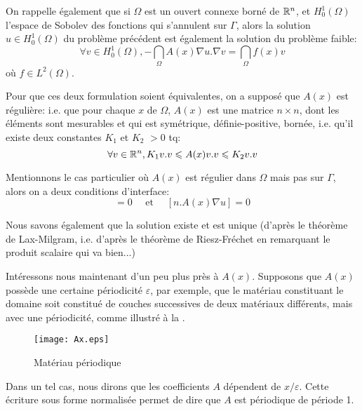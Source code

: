 On rappelle également que si $\Omega$ est un ouvert connexe borné de $\mathbb R^n$, et
$H_0^1(\Omega)$ l'espace de Sobolev des fonctions qui s'annulent sur $\Gamma$, alors la solution
$u\in H_0^1(\Omega)$ du problème précédent est également la solution du problème
faible:
\begin{equation}
\forall v\in H_0^1(\Omega), -\dint_\Omega A(x)\nabla u.\nabla v = \dint_\Omega f(x)v
\end{equation}
où $f\in L^2(\Omega)$.

Pour que ces deux formulation soient équivalentes, on a supposé que $A(x)$ est
régulière: i.e. que pour chaque $x$ de $\Omega$, $A(x)$ est une matrice $n\times n$,
dont les éléments sont mesurables et qui est symétrique, définie-positive, bornée, i.e. qu'il existe 
deux constantes $K_1$ et $K_2$ $>0$ tq:
\begin{equation}\forall v\in\mathbb R^n, K_1 v.v \leqslant A(x) v.v \leqslant K_2 v.v\end{equation}

Mentionnons le cas particulier où $A(x)$ est régulier dans $\Omega$ mais
pas sur $\Gamma$, alors on a deux conditions d'interface:
\begin{equation}
[u]=0 \quad\text{ et }\quad [n.A(x)\nabla u]=0
\end{equation}

Nous savons également que la solution existe et est unique (d'après le théorème de Lax-Milgram,
 i.e. d'après le théorème de Riesz-Fréchet 
en remarquant le produit scalaire qui va bien...)

\medskip
Intéressons nous maintenant d'un peu plus près à $A(x)$.
Supposons que $A(x)$ possède une certaine périodicité $\varepsilon$,
par exemple, que le matériau constituant le domaine soit constitué de couches successives
de deux matériaux différents, mais avec une périodicité, comme illustré à la .
\begin{figure}[htb]
\centerline{\texttt{[image: Ax.eps]}}
\caption{Matériau périodique}\label{Fig-Ax}
\end{figure}
Dans un tel cas, nous dirons que les coefficients $A$ dépendent de $x/\varepsilon$.
Cette écriture sous forme normalisée permet de dire que $A$ est périodique de période 1.

